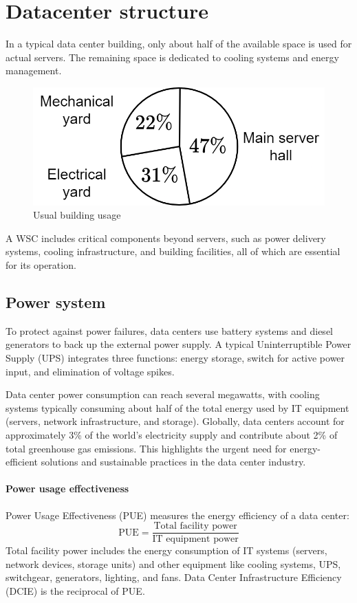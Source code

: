 \section{Datacenter structure}

In a typical data center building, only about half of the available space is used for actual servers. 
The remaining space is dedicated to cooling systems and energy management.
\begin{figure}[H]
    \centering
    \includegraphics[width=0.5\linewidth]{images/build.png}
    \caption{Usual building usage}
\end{figure}
A WSC includes critical components beyond servers, such as power delivery systems, cooling infrastructure, and building facilities, all of which are essential for its operation.

\subsection{Power system}
To protect against power failures, data centers use battery systems and diesel generators to back up the external power supply. 
A typical Uninterruptible Power Supply (UPS) integrates three functions: energy storage, switch for active power input, and elimination of voltage spikes. 

Data center power consumption can reach several megawatts, with cooling systems typically consuming about half of the total energy used by IT equipment (servers, network infrastructure, and storage). 
Globally, data centers account for approximately 3\% of the world's electricity supply and contribute about 2\% of total greenhouse gas emissions. 
This highlights the urgent need for energy-efficient solutions and sustainable practices in the data center industry.

\paragraph*{Power usage effectiveness}
Power Usage Effectiveness (PUE) measures the energy efficiency of a data center:
\[\text{PUE}=\dfrac{\text{Total facility power}}{\text{IT equipment power}}\]
Total facility power includes the energy consumption of IT systems (servers, network devices, storage units) and other equipment like cooling systems, UPS, switchgear, generators, lighting, and fans. 
Data Center Infrastructure Efficiency (DCIE) is the reciprocal of PUE.

